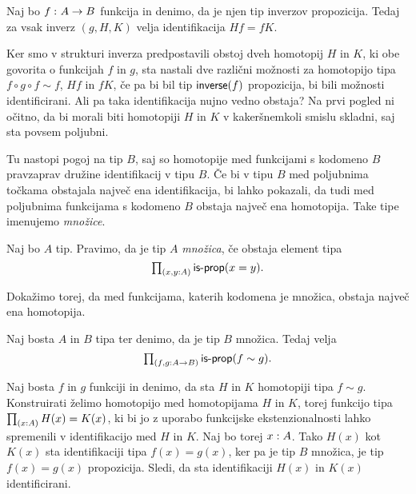 \begin{trditev}
  \label{inv-prop-coherence}
  Naj bo \(f \,\colon A \to B\) funkcija in denimo, da je njen tip inverzov propozicija. Tedaj za vsak inverz \((g, H, K)\) velja identifikacija \(Hf = fK\).
\end{trditev}


Ker smo v strukturi inverza predpostavili obstoj dveh homotopij \(H\) in \(K\), ki obe govorita o funkcijah \(f\) in \(g\), sta nastali dve različni možnosti za homotopijo tipa \(f \circ g \circ f \sim f\), \(Hf\) in \(fK\), če pa bi bil tip \(\textnormal{\textsf{inverse}}(f)\) propozicija, bi bili možnosti identificirani. Ali pa taka identifikacija nujno vedno obstaja? Na prvi pogled ni očitno, da bi morali biti homotopiji \(H\) in \(K\) v kakeršnemkoli smislu skladni, saj sta povsem poljubni.

Tu nastopi pogoj na tip \(B\), saj so homotopije med funkcijami s kodomeno \(B\) pravzaprav družine identifikacij v tipu \(B\). Če bi v tipu \(B\) med poljubnima točkama obstajala največ ena identifikacija, bi lahko pokazali, da tudi med poljubnima funkcijama s kodomeno \(B\) obstaja največ ena homotopija. Take tipe imenujemo \emph{množice}.

\begin{definicija}
  Naj bo \(A\) tip. Pravimo, da je tip \(A\) \emph{množica}, če obstaja element tipa
  \[\textstyle \prod_{\left( x, y : A \right)} \textnormal{\textsf{is-prop}}(x = y).\]
\end{definicija}

Dokažimo torej, da med funkcijama, katerih kodomena je množica, obstaja največ ena homotopija.

\begin{trditev}
  \label{is-prop-htpy-set}
  Naj bosta \(A\) in \(B\) tipa ter denimo, da je tip \(B\) množica. Tedaj velja
  \[\textstyle \prod_{\left( f, g : A \to B \right)} \textnormal{\textsf{is-prop}}(f \sim g).\]
\end{trditev}

\begin{dokaz}
  Naj bosta \(f\) in \(g\) funkciji in denimo, da sta \(H\) in \(K\) homotopiji tipa \(f \sim g\). Konstruirati želimo homotopijo med homotopijama \(H\) in \(K\), torej funkcijo tipa
  \(\textstyle \prod_{\left( x : A \right)} H(x) = K(x)\), ki bi jo z uporabo funkcijske ekstenzionalnosti lahko spremenili v identifikacijo med \(H\) in \(K\). Naj bo torej \(x : A\).
  Tako \(H(x)\) kot \(K(x)\) sta identifikaciji tipa \(f(x) = g(x)\), ker pa je tip \(B\) množica, je tip \(f(x) = g(x)\) propozicija. Sledi, da sta identifikaciji \(H(x)\) in \(K(x)\) identificirani.
\end{dokaz}

